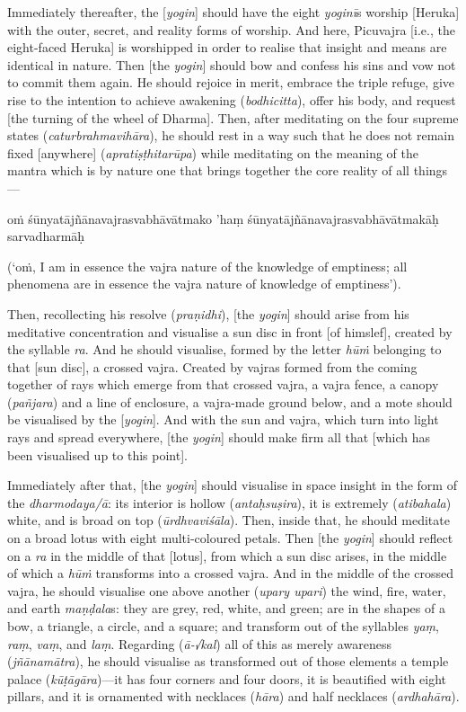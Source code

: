 \documentclass[naipra.tex]{subfiles}
\begin{document}
Immediately thereafter, the [\emph{yogin}] should have the eight \emph{yoginī}s worship [Heruka] with the outer, secret, and reality forms of worship. 
And here, Picuvajra [i.e., the eight-faced Heruka] is worshipped in order to realise that insight and means are identical in nature.
Then [the \emph{yogin}] should bow and confess his sins and vow not to commit them again.
He should rejoice in merit, embrace the triple refuge, give rise to the intention to achieve awakening (\emph{bodhicitta}), offer his body, and request [the turning of the wheel of Dharma].
Then, after meditating on the four supreme states (\emph{caturbrahmavihāra}), he should rest in a way such that he does not remain fixed [anywhere] (\emph{apratiṣṭhitarūpa}) while meditating on the meaning of the mantra which is by nature one that brings together the core reality of all things—\begin{mantra}oṁ śūnyatājñānavajrasvabhāvātmako 'haṃ śūnyatājñānavajrasvabhāvātmakāḥ sarvadharmāḥ\end{mantra} (`oṁ, I am in essence the vajra nature of the knowledge of emptiness; all phenomena are in essence the vajra nature of knowledge of emptiness').

Then, recollecting his resolve (\emph{praṇidhi}), [the \emph{yogin}] should arise from his meditative concentration and visualise a sun disc in front [of himslef], created by the syllable \emph{ra}.
And he should visualise, formed by the letter \emph{hūṁ} belonging to that [sun disc], a crossed vajra.
Created by vajras formed from the coming together of rays which emerge from that crossed vajra, a vajra fence, a canopy (\emph{pañjara}) and a line of enclosure, a vajra-made ground below, and a mote should be visualised by the [\emph{yogin}].
And with the sun and vajra, which turn into light rays and spread everywhere, [the \emph{yogin}] should make firm all that [which has been visualised up to this point].

Immediately after that, [the \emph{yogin}] should visualise in space insight in the form of the \emph{dharmodaya/ā}: its interior is hollow (\emph{antaḥsuṣira}), it is extremely (\emph{atibahala}) white, and is broad on top (\emph{ūrdhvaviśāla}).
Then, inside that, he should meditate on a broad lotus with eight multi-coloured petals.
Then [the \emph{yogin}] should reflect on a \emph{ra} in the middle of that [lotus], from which a sun disc arises, in the middle of which a \emph{hūṁ} transforms into a crossed vajra. 
And in the middle of the crossed vajra, he should visualise one above another (\emph{upary upari}) the wind, fire, water, and earth \emph{maṇḍala}s: they are grey, red, white, and green; are in the shapes of a bow, a triangle, a circle, and a square; and transform out of the syllables \emph{yaṃ}, \emph{raṃ}, \emph{vaṃ}, and \emph{laṃ}.
Regarding (\emph{ā-√kal}) all of this as merely awareness (\emph{jñānamātra}), he should visualise as transformed out of those elements a temple palace (\emph{kūṭāgāra})—it has four corners and four doors, it is beautified with eight pillars, and it is ornamented with necklaces (\emph{hāra}) and half necklaces (\emph{ardhahāra}).
\end{document}
